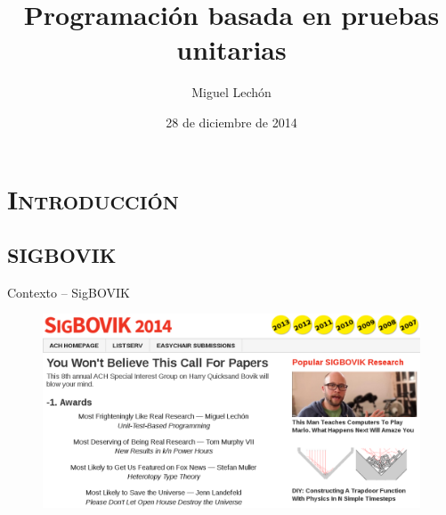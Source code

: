 \documentclass[xcolor=x11names,compress]{beamer}
\renewcommand{\(}{\begin{columns}}
\renewcommand{\)}{\end{columns}}
\newcommand{\<}[1]{\begin{column}{#1}}
\renewcommand{\>}{\end{column}}
\begin{document}


\begin{frame}
    \title{Programación basada en pruebas unitarias}
\author{Miguel Lechón} 
\date{28 de diciembre de 2014}
\titlepage
\end{frame}


\section{\scshape Introducción}
\subsection{SIGBOVIK}
\begin{frame}{Contexto -- SigBOVIK}
    \begin{figure}[t]
        \centering
        \includegraphics[width=1.0\textwidth]{images/sigbovik.png}
    \end{figure}
\end{frame}
\end{document}
